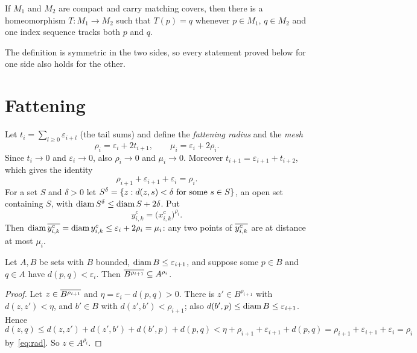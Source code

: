 \begin{theorem}\label{thm:matching}
If $M_1$ and $M_2$ are compact and carry matching covers, then there is a homeomorphism $T\colon M_1\to M_2$ such that
$T(p)=q$ whenever $p\in M_1$, $q\in M_2$ and one index sequence tracks both $p$ and $q$.
\end{theorem}


The definition is symmetric in the two sides, so every statement proved below for one side also holds for the other.

\section{Fattening}

Let $t_i=\sum_{l\ge0}\varepsilon_{i+l}$ (the tail sums) and define the \emph{fattening radius} and the \emph{mesh}
\[
\rho_i=\varepsilon_i+2t_{i+1},\qquad \mu_i=\varepsilon_i+2\rho_i .
\]
Since $t_i\to0$ and $\varepsilon_i\to0$, also $\rho_i\to0$ and $\mu_i\to0$. Moreover $t_{i+1}=\varepsilon_{i+1}+t_{i+2}$, which
gives the identity
\begin{equation}\label{eq:rad}
\rho_{i+1}+\varepsilon_{i+1}+\varepsilon_i=\rho_i .
\end{equation}
For a set $S$ and $\delta>0$ let $S^\delta=\left\{ z: d(z,s)<\delta\text{ for some }s\in S \right\}$, an open set containing $S$, with
$\operatorname{diam} S^\delta\le\operatorname{diam} S+2\delta$. Put
\[
y^c_{i,k}=\bigl(x^c_{i,k}\bigr)^{\rho_i}.
\]
Then $\operatorname{diam}\overline{y^c_{i,k}}=\operatorname{diam} y^c_{i,k}\le\varepsilon_i+2\rho_i=\mu_i$: any two points of $\overline{y^c_{i,k}}$ are at distance at most
$\mu_i$.


\begin{lemma}[Nesting]\label{lem:nesting}
Let $A,B$ be sets with $B$ bounded, $\operatorname{diam} B\le\varepsilon_{i+1}$, and suppose some $p\in B$ and $q\in A$ have
$d(p,q)<\varepsilon_i$. Then $\overline{B^{\rho_{i+1}}}\subseteq A^{\rho_i}$.
\end{lemma}

\begin{proof}
Let $z\in\overline{B^{\rho_{i+1}}}$ and $\eta=\varepsilon_i-d(p,q)>0$. There is $z'\in B^{\rho_{i+1}}$ with $d(z,z')<\eta$, and
$b'\in B$ with $d(z',b')<\rho_{i+1}$; also $d(b',p)\le\operatorname{diam} B\le\varepsilon_{i+1}$. Hence
\[
d(z,q)\le d(z,z')+d(z',b')+d(b',p)+d(p,q)<\eta+\rho_{i+1}+\varepsilon_{i+1}+d(p,q)=\rho_{i+1}+\varepsilon_{i+1}+\varepsilon_i=\rho_i
\]
by~\eqref{eq:rad}. So $z\in A^{\rho_i}$.
\end{proof}

